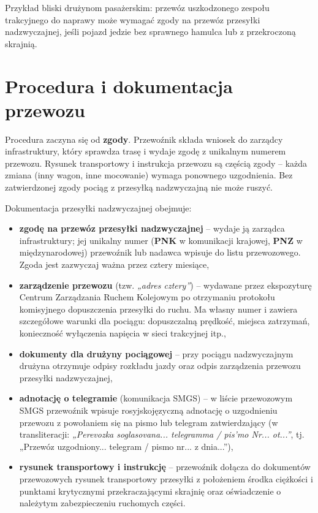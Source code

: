 Przykład bliski drużynom pasażerskim: przewóz uszkodzonego zespołu trakcyjnego do naprawy może wymagać zgody na przewóz przesyłki nadzwyczajnej, jeśli pojazd jedzie bez sprawnego hamulca lub z przekroczoną skrajnią.

\section{Procedura i dokumentacja przewozu}

Procedura zaczyna się od \textbf{zgody}. Przewoźnik składa wniosek do zarządcy infrastruktury, który sprawdza trasę i wydaje zgodę z unikalnym numerem przewozu. Rysunek transportowy i instrukcja przewozu są częścią zgody – każda zmiana (inny wagon, inne mocowanie) wymaga ponownego uzgodnienia. Bez zatwierdzonej zgody pociąg z przesyłką nadzwyczajną nie może ruszyć.

Dokumentacja przesyłki nadzwyczajnej obejmuje:
\begin{itemize}
	\item \textbf{zgodę na przewóz przesyłki nadzwyczajnej} – wydaje ją zarządca infrastruktury; jej unikalny numer (\textbf{PNK} w komunikacji krajowej, \textbf{PNZ} w międzynarodowej) przewoźnik lub nadawca wpisuje do listu przewozowego. Zgoda jest zazwyczaj ważna przez cztery miesiące,
	\item \textbf{zarządzenie przewozu} (tzw. \textit{„adres cztery”}) – wydawane przez ekspozyturę Centrum Zarządzania Ruchem Kolejowym po otrzymaniu protokołu komisyjnego dopuszczenia przesyłki do ruchu. Ma własny numer i zawiera szczegółowe warunki dla pociągu: dopuszczalną prędkość, miejsca zatrzymań, konieczność wyłączenia napięcia w sieci trakcyjnej itp.,
	\item \textbf{dokumenty dla drużyny pociągowej} – przy pociągu nadzwyczajnym drużyna otrzymuje odpisy rozkładu jazdy oraz odpis zarządzenia przewozu przesyłki nadzwyczajnej,
	\item \textbf{adnotację o telegramie} (komunikacja SMGS) – w liście przewozowym SMGS przewoźnik wpisuje rosyjskojęzyczną adnotację o uzgodnieniu przewozu z powołaniem się na pismo lub telegram zatwierdzający (w transliteracji: \textit{„Perevozka soglasovana... telegramma / pis'mo Nr... ot...”}, tj. „Przewóz uzgodniony... telegram / pismo nr... z dnia...”),
	\item \textbf{rysunek transportowy i instrukcję} – przewoźnik dołącza do dokumentów przewozowych rysunek transportowy przesyłki z położeniem środka ciężkości i punktami krytycznymi przekraczającymi skrajnię oraz oświadczenie o należytym zabezpieczeniu ruchomych części.
\end{itemize}

